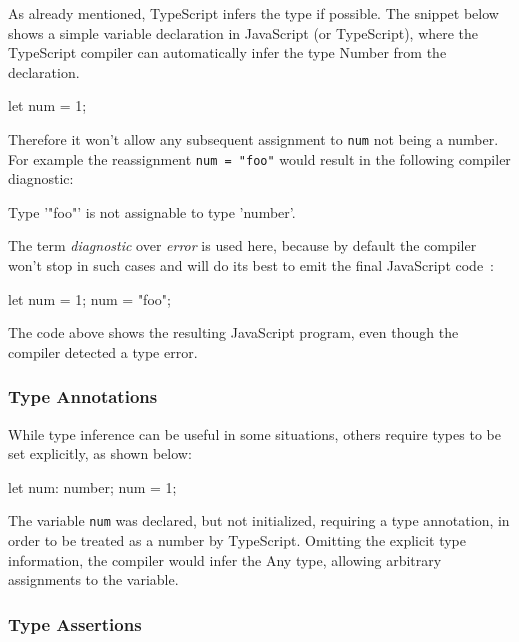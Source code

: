As already mentioned, TypeScript infers the type if possible. The snippet below shows a simple variable declaration in JavaScript (or TypeScript), where the TypeScript compiler can automatically infer the type Number from the declaration.
\begin{JsCode}[numbers=none]
let num = 1;
\end{JsCode}
Therefore it won't allow any subsequent assignment to \texttt{num} not being a number. For example the reassignment \texttt{num = "foo"} would result in the following compiler diagnostic:
\begin{JsCode}[numbers=none]
Type '"foo"' is not assignable to type 'number'.
\end{JsCode}
The term \emph{diagnostic} over \emph{error} is used here, because by default the compiler won't stop in such cases and will do its best to emit the final JavaScript code~\cite[p.~12]{TypeScriptBook:Syed:2017}:
\begin{JsCode}[numbers=none]
let num = 1;
num = "foo";
\end{JsCode}
The code above shows the resulting JavaScript program, even though the compiler detected a type error.

\subsubsection{Type Annotations}
\label{sec:ts-type-annotations}

While type inference can be useful in some situations, others require types to be set explicitly, as shown below:
\begin{JsCode}[numbers=none]
let num: number;
num = 1;
\end{JsCode}
The variable \texttt{num} was declared, but not initialized, requiring  a type annotation, in order to be treated as a number by TypeScript. Omitting the explicit type information, the compiler would infer the Any type, allowing arbitrary assignments to the variable.

\subsubsection{Type Assertions}
\label{sec:ts-type-assertions}

